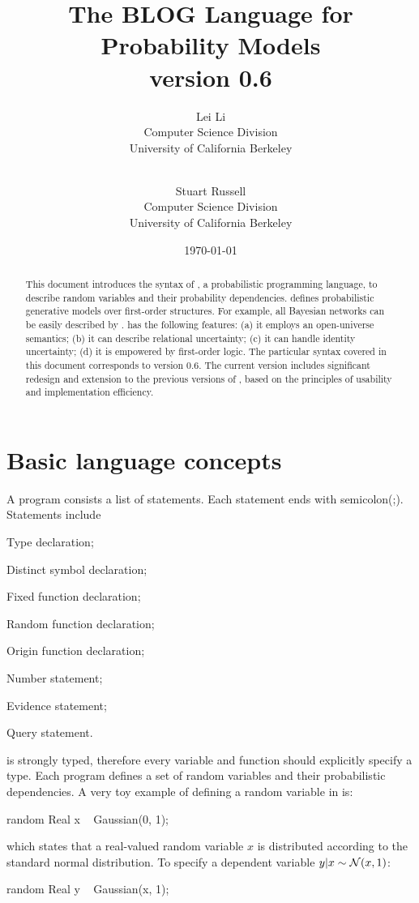 \documentclass[12pt]{article}
\title{The BLOG Language for Probability Models\\ {version 0.6}}
\author{Lei Li\\
              Computer Science Division\\
              University of California Berkeley\\
               \email{leili@cs.berkeley.edu}\\
\and
               Stuart Russell\\
              Computer Science Division\\
              University of California Berkeley\\
               \email{russell@cs.berkeley.edu}
               }
\date{\today}
\begin{document}
\maketitle


\begin{abstract}
This document introduces the syntax of \bl, a probabilistic programming language, to describe random variables and their probability dependencies.  
\bl defines probabilistic generative models over first-order structures. For example, all Bayesian networks can be easily described by \bl.  
\bl has the following features: 
(a) it employs an open-universe semantics;
(b) it can describe relational uncertainty;
(c) it can handle identity uncertainty;
(d) it is empowered by first-order logic.
The particular syntax covered in this document corresponds to \bl version 0.6. The current version includes significant redesign and extension to the previous versions of \bl, based on the principles of usability and implementation efficiency. 
\end{abstract}


\tableofcontents


\section{Basic language concepts}
A \bl program consists a list of statements.
Each statement ends with semicolon(;). 
Statements include 
\begin{enumerate*}
\item Type declaration; 
\item Distinct symbol declaration;
\item Fixed function declaration;
\item Random function declaration;
\item Origin function declaration;
\item Number statement;
\item Evidence statement;
\item Query statement.
\end{enumerate*}

\bl is strongly typed, therefore every variable and function should explicitly specify a type.
Each \bl program defines a set of random variables and their probabilistic dependencies. 
A very toy example of defining a random variable in \bl is:

\begin{blogcode}
random Real x ~ Gaussian(0, 1);
\end{blogcode}
which states that a real-valued random variable $x$ is distributed according to the standard normal distribution. 
To specify a dependent variable $y | x \sim \mathcal{N}(x, 1)$:
\begin{blogcode}
random Real y ~ Gaussian(x, 1);
\end{blogcode}
\end{document}

